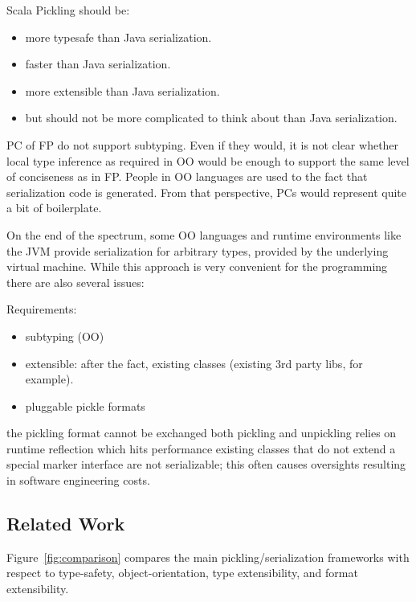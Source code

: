 \documentclass[preprint,10pt]{sigplanconf}
\begin{document}
Scala Pickling should be:
\begin{itemize}
  \item more typesafe than Java serialization.
  \item faster than Java serialization.
  \item more extensible than Java serialization.
  \item but should not be more complicated to think about than Java serialization.
\end{itemize}

PC of FP do not support subtyping. Even if they would, it is not clear whether local type inference as required in OO would be enough to support the same level of conciseness as in FP. People in OO languages are used to the fact that serialization code is generated. From that perspective, PCs would represent quite a bit of boilerplate.

On the end of the spectrum, some OO languages and runtime environments like the JVM provide serialization for arbitrary types, provided by the underlying virtual machine. While this approach is very convenient for the programming there are also several issues:

Requirements:

\begin{itemize}
  \item subtyping (OO)
  \item extensible: after the fact, existing classes (existing 3rd party libs, for example).
  \item pluggable pickle formats
\end{itemize}

the pickling format cannot be exchanged
both pickling and unpickling relies on runtime reflection which hits performance
existing classes that do not extend a special marker interface are not serializable; this often causes oversights resulting in software engineering costs.


\subsection{Related Work}

Figure~\ref{fig:comparison} compares the main pickling/serialization
frameworks with respect to type-safety, object-orientation, type
extensibility, and format extensibility.
\end{document}

